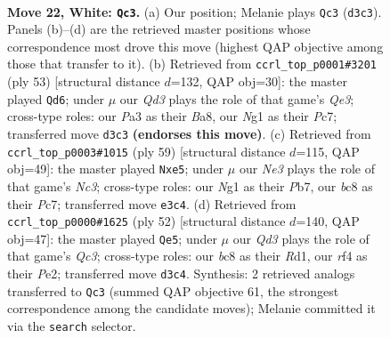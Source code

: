 \documentclass[11pt]{article}
\begin{document}
\clearpage

\begin{figure}[p]\centering
\begin{subfigure}{0.46\textwidth}\centering
\resizebox{\linewidth}{!}{%
\newchessgame
\chessboard[
  setfen={r1b2k2/pp3pp1/n3p3/3pq3/3n1r2/PP1QN3/6PP/R2K2NR w - - 0 22},
  showmover=false,
  pgfstyle=straightmove, color=movearrow, markmove={d3-c3}
]}
\caption{}
\end{subfigure}\hfill
\begin{subfigure}{0.46\textwidth}\centering
\resizebox{\linewidth}{!}{%
\newchessgame
\chessboard[
  setfen={br4k1/2p3p1/p3q1np/5p2/P4P2/2PP2RP/2QB2P1/3N2K1 b - - 2 27},
  showmover=false,
  pgfstyle=straightmove, color=movearrow, markmove={e6-d6}
]}
\caption{}
\end{subfigure}
\\[4pt]
\begin{subfigure}{0.46\textwidth}\centering
\resizebox{\linewidth}{!}{%
\newchessgame
\chessboard[
  setfen={6k1/1ppr2pp/2n1qp2/p3N3/4P3/PP2R1P1/1BQ2PKP/8 b - - 0 30},
  showmover=false,
  pgfstyle=straightmove, color=movearrow, markmove={c6-e5}
]}
\caption{}
\end{subfigure}\hfill
\begin{subfigure}{0.46\textwidth}\centering
\resizebox{\linewidth}{!}{%
\newchessgame
\chessboard[
  setfen={r4r1k/1p2q1pp/2p1bn2/p7/PnN5/2Q2NPP/1P2P1B1/R2R2K1 w - - 1 27},
  showmover=false,
  pgfstyle=straightmove, color=movearrow, markmove={c3-e5}
]}
\caption{}
\end{subfigure}
\caption{\textbf{Move 22, White: \texttt{Qc3}.} (a) Our position; Melanie plays \texttt{Qc3} (\texttt{d3c3}). Panels (b)--(d) are the retrieved master positions whose correspondence most drove this move (highest QAP objective among those that transfer to it). (b) Retrieved from \texttt{ccrl\_top\_p0001\#3201} (ply 53) [structural distance $d$=132, QAP obj=30]: the master played \texttt{Qd6}; under $\mu$ our \emph{Qd3} plays the role of that game's \emph{Qe3}; cross-type roles: our \emph{P}a3 as their \emph{B}a8, our \emph{N}g1 as their \emph{P}c7; transferred move \texttt{d3c3} \textbf{(endorses this move)}. (c) Retrieved from \texttt{ccrl\_top\_p0003\#1015} (ply 59) [structural distance $d$=115, QAP obj=49]: the master played \texttt{Nxe5}; under $\mu$ our \emph{Ne3} plays the role of that game's \emph{Nc3}; cross-type roles: our \emph{N}g1 as their \emph{P}b7, our \emph{b}c8 as their \emph{P}c7; transferred move \texttt{e3c4}. (d) Retrieved from \texttt{ccrl\_top\_p0000\#1625} (ply 52) [structural distance $d$=140, QAP obj=47]: the master played \texttt{Qe5}; under $\mu$ our \emph{Qd3} plays the role of that game's \emph{Qc3}; cross-type roles: our \emph{b}c8 as their \emph{R}d1, our \emph{r}f4 as their \emph{P}e2; transferred move \texttt{d3c4}. Synthesis: 2 retrieved analogs transferred to \texttt{Qc3} (summed QAP objective 61, the strongest correspondence among the candidate moves); Melanie committed it via the \texttt{search} selector.}
\label{fig:thought-m42}
\end{figure}
\end{document}
